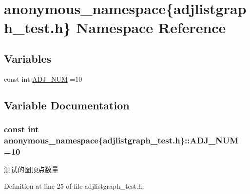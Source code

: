 \hypertarget{namespaceanonymous__namespace_02adjlistgraph__test_8h_03}{}\section{anonymous\+\_\+namespace\{adjlistgraph\+\_\+test.\+h\} Namespace Reference}
\label{namespaceanonymous__namespace_02adjlistgraph__test_8h_03}
\subsection*{Variables}
\begin{DoxyCompactItemize}
\item 
const int \hyperlink{namespaceanonymous__namespace_02adjlistgraph__test_8h_03_a398e679d6fa790bc3ff7d6a7c92a7d74}{A\+D\+J\+\_\+\+N\+U\+M} =10
\end{DoxyCompactItemize}


\subsection{Variable Documentation}
\hypertarget{namespaceanonymous__namespace_02adjlistgraph__test_8h_03_a398e679d6fa790bc3ff7d6a7c92a7d74}{}
\subsubsection[{A\+D\+J\+\_\+\+N\+U\+M}]{\setlength{\rightskip}{0pt plus 5cm}const int anonymous\+\_\+namespace\{adjlistgraph\+\_\+test.\+h\}\+::A\+D\+J\+\_\+\+N\+U\+M =10}\label{namespaceanonymous__namespace_02adjlistgraph__test_8h_03_a398e679d6fa790bc3ff7d6a7c92a7d74}
测试的图顶点数量 

Definition at line 25 of file adjlistgraph\+\_\+test.\+h.

